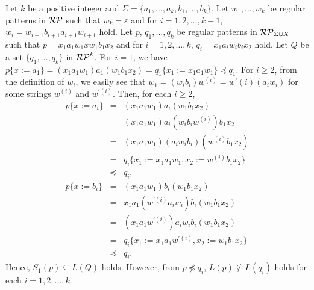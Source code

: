 \begin{ex}\label{counter-example4Theorem11}
    Let $k$ be a positive integer and $\Sigma= \{a_{1},\ldots,a_{k},b_{1},\ldots,b_{k}\}$.
    Let $w_{1},\ldots,w_{k}$ be regular patterns in $\mathcal{RP}$ such that 
    $w_{k} = \varepsilon$ and for $i=1,2,\ldots,k-1$, $w_{i} = w_{i+1}b_{i+1}a_{i+1}w_{i+1}$ hold.
    Let $p$, $q_{1},\ldots,q_{k}$ be regular patterns in {\color{red}$\mathcal{RP}_{\Sigma\cup X}$} such that
    $p = x_{1}a_{1}w_{1}xw_{1}b_{1}x_{2}$ and  for $i=1,2,\ldots,k$, $q_{i} = x_{1}a_{i}w_{i}b_{i}x_{2}$ hold.
    Let $Q$ be a set $\{q_{1},\ldots,q_{k}\}$ in $\mathcal{RP}^{k}$.
    For $i=1$, we have $p\{x:=a_{1}\} =(x_{1}a_{1}w_{1})a_{1}(w_{1}b_{1}x_{2})=q_1\{x_{1}:=x_{1}a_{1}w_{1}\}\preceq q_{1}$.
    For $i\geq 2$, from the definition of $w_{i}$,
    we easily see that $w_{1}=(w_{i}b_{i})w^{(i)}=w{'(i)}(a_{i}w_{i})$ for some strings $w^{(i)}$ and $w^{'(i)}$.
    Then, for each $i\geq 2$, 
    \begin{eqnarray*}
        p \{ x:=a_{i} \} & = & (x_{1}a_{1}w_{1})a_{i}(w_{1}b_{1}x_{2})\\
        & = & (x_{1}a_{1}w_{1})a_{i}(w_{i}b_{i}w^{(i)})b_{1}x_{2}\\
        & = & (x_{1}a_{1}w_{1})(a_{i}w_{i}b_{i})(w^{(i)}b_{1}x_{2})\\
        & = & q_{i} \{ x_{1} := x_{1}a_{1}w_{1}, x_{2} := w^{(i)}b_{1}x_{2} \}\\
        & \preceq & q_{i},\\
        p \{ x:=b_{i} \} & = & (x_{1}a_{1}w_{1})b_{i}(w_{1}b_{1}x_{2})\\
        & = & x_{1}a_{1}(w^{\prime (i)}a_{i}w_{i})b_{i}(w_{1}b_{1}x_{2}) \\
        & = & (x_{1}a_{1}w^{\prime (i)})a_{i}w_{i}b_{i}(w_{1}b_{1}x_{2}) \\
        & = & q_{i} \{ x_{1} := x_{1}a_{1}w^{\prime (i)}, x_{2} := w_{1}b_{1}x_{2} \}\\
        & \preceq & q_{i}.
    \end{eqnarray*}
%
   Hence, $S_{1}(p) \subseteq L(Q)$ holds.
   However, from $p \not \preceq q_{i}$, $L(p) \not \subseteq L(q_{i})$ holds for each $i=1,2,\ldots,k$.
\end{ex}

